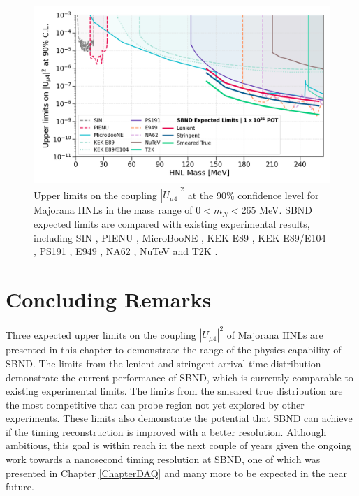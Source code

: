 \begin{figure}[htb!]
    \centering
    \includegraphics[width=\textwidth]{sensitivity}
    \caption[Comparison Between SBND Expected Limits and Existing Limits]{
    Upper limits on the coupling $|U_{\mu4}|^{2}$ at the 90\% confidence level for Majorana HNLs in the mass range of $0 < m_{N} < 265$ MeV.
SBND expected limits are compared with existing experimental results, including SIN \cite{SIN3}, PIENU \cite{PIENU}, MicroBooNE \cite{uboone1, uboone2, uboone3}, KEK E89 \cite{KEK2}, KEK E89/E104 \cite{KEK3}, PS191 \cite{PS191C}, E949 \cite{E949}, NA62 \cite{NA62B}, NuTeV \cite{NuTeV} and T2K \cite{t2k}.
}
\label{fig:sensitivity}
\end{figure}

\section{Concluding Remarks}
\label{sec:result_remarks}

Three expected upper limits on the coupling $|U_{\mu4}|^2$ of Majorana HNLs are presented in this chapter to demonstrate the range of the physics capability of SBND.
The limits from the lenient and stringent arrival time distribution demonstrate the current performance of SBND, which is currently comparable to existing experimental limits.
The limits from the smeared true distribution are the most competitive that can probe region not yet explored by other experiments.
These limits also demonstrate the potential that SBND can achieve if the timing reconstruction is improved with a better resolution.
Although ambitious, this goal is within reach in the next couple of years given the ongoing work towards a nanosecond timing resolution at SBND, one of which was presented in Chapter \ref{ChapterDAQ} and many more to be expected in the near future.
 


